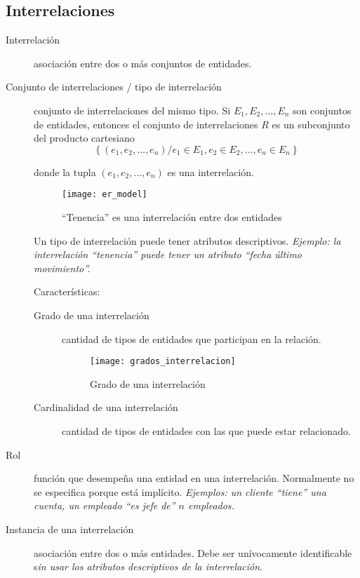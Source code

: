 \documentclass[a4paper, twoside]{article}
\begin{document}
\subsection{Interrelaciones}
\begin{description}
	\item[Interrelación] asociación entre dos o más conjuntos de entidades.

	\item[Conjunto de interrelaciones / tipo de interrelación] conjunto de interrelaciones del mismo tipo. Si $E_{1}, E_{2}, \ldots, E_{n}$ son conjuntos de entidades, entonces el conjunto de interrelaciones $R$ es un subconjunto del producto cartesiano
	\[
		\left\{ \left(e_{1},e_{2},\ldots,e_{n}\right)/e_{1}\in E_{1},e_{2}\in E_{2},\ldots,e_{n}\in E_{n}\right\} 
	\]

	donde la tupla $\left(e_{1},e_{2},\ldots,e_{n}\right)$ es una interrelación.
	\begin{figure}[H]
		\centering
		\texttt{[image: er\_model]}
		\caption{``Tenencia'' es una interrelación entre dos entidades}
	\end{figure}

	Un tipo de interrelación puede tener atributos descriptivos. \emph{Ejemplo: la interrelación ``tenencia'' puede tener un atributo ``fecha último movimiento''.}

	Características:
	\begin{description}
		\item[Grado de una interrelación] cantidad de tipos de entidades que participan en la relación.
		\begin{figure}[H]
			\centering
			\texttt{[image: grados\_interrelacion]}
			\caption{Grado de una interrelación}
		\end{figure}

		\item[Cardinalidad de una interrelación] cantidad de tipos de entidades con las que puede estar relacionado.
	\end{description}

	\item[Rol] función que desempeña una entidad en una interrelación. Normalmente no se especifica porque está implícito. \emph{Ejemplos: un cliente ``tiene'' una cuenta, un empleado ``es jefe de'' $n$ empleados.}
	\item[Instancia de una interrelación] asociación entre dos o más entidades. Debe ser unívocamente identificable s\emph{in usar los atributos descriptivos de la interrelación}.
\end{description}
\end{document}
